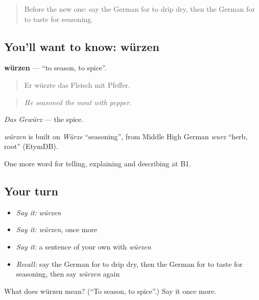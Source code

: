 \label{lesson:GE-C328-wuerzen}



\begin{quote}
Before the new one: say the German for to drip dry, then the German for to taste for seasoning.
\end{quote}

\subsection*{You'll want to know: würzen}
\textbf{würzen} — \textquotedblleft{}to season, to spice\textquotedblright{}.

\begin{quote}
Er würzte das Fleisch mit Pfeffer.
\end{quote}

\begin{quote}
\emph{He seasoned the meat with pepper.}
\end{quote}

\emph{Das Gewürz} — the spice.

\begin{cousinweb}
\emph{würzen} is built on \emph{Würze} \textquotedblleft{}seasoning\textquotedblright{}, from Middle High German \emph{wurz} \textquotedblleft{}herb, root\textquotedblright{} (EtymDB).
\end{cousinweb}

\begin{grammarlens}[title={What you've built}]
One more word for telling, explaining and describing at B1.
\end{grammarlens}

\subsection*{Your turn}
\begin{itemize}
\raggedright
  \item \emph{Say it:} \emph{würzen}
  \item \emph{Say it:} \emph{würzen}, once more
  \item \emph{Say it:} a sentence of your own with \emph{würzen}
  \item \emph{Recall:} say the German for to drip dry, then the German for to taste for seasoning, then say \emph{würzen} again
\end{itemize}

\begin{tcolorbox}[breakable,colback=teal!4,colframe=teal!35!black,title={Before you move on}]
What does würzen mean? (\textquotedblleft{}To season, to spice\textquotedblright{}.) Say it once more.
\end{tcolorbox}

